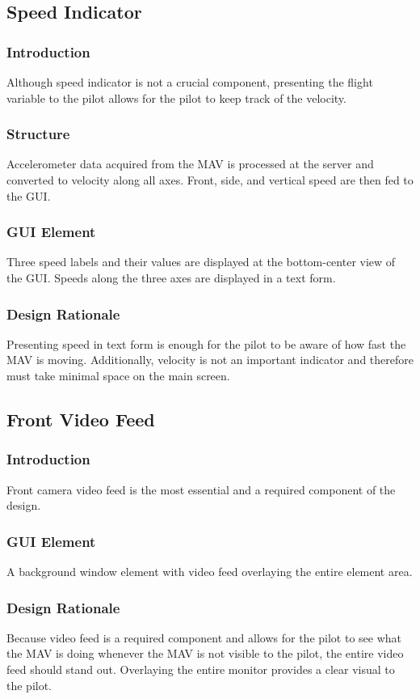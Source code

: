\documentclass[onecolumn, oneside, letterpaper, draftclsnofoot, 10pt, compsoc]{IEEEtran}
\begin{document}
\subsection{Speed Indicator}
\subsubsection{Introduction}
Although speed indicator is not a crucial component, presenting the flight variable to the pilot allows for the pilot to keep track of the velocity.

\subsubsection{Structure}
Accelerometer data acquired from the MAV is processed at the server and converted to velocity along all axes. Front, side, and vertical speed are then fed to the GUI.

\subsubsection{GUI Element}
Three speed labels and their values are displayed at the bottom-center view of the GUI. Speeds along the three axes are displayed in a text form.

\subsubsection{Design Rationale}
Presenting speed in text form is enough for the pilot to be aware of how fast the MAV is moving. Additionally, velocity is not an important indicator and therefore must take minimal space on the main screen.

\subsection{Front Video Feed}
\subsubsection{Introduction}
Front camera video feed is the most essential and a required component of the design.

\subsubsection{GUI Element}
A background window element with video feed overlaying the entire element area.

\subsubsection{Design Rationale}
Because video feed is a required component and allows for the pilot to see what the MAV is doing whenever the MAV is not visible to the pilot, the entire video feed should stand out. Overlaying the entire monitor provides a clear visual to the pilot.
\end{document}
